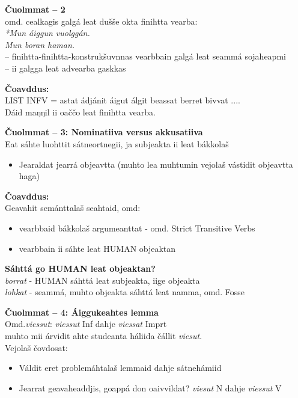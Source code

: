 \documentclass[landscape,norsk,11pt]{seminar}
\begin{document}
\begin{slide}
\newslide
\textbf{Čuolmmat -- 2} \\
omd. cealkagis galgá leat dušše okta finihtta vearba: \\
\textit{*Mun áiggun vuolggán.}\\
\textit{Mun boran haman.}\\
-- finihtta-finihtta-konstrukšuvnnas vearbbain galgá leat seammá sojaheapmi\\
-- ii galgga leat advearba gaskkas

\newslide
\textbf{Čoavddus:} \\
LIST INFV =  astat ádjánit áigut álgit beassat berret bivvat .... \\
Dáid maŋŋil ii oaččo leat finihtta vearba.


\newslide
\textbf{Čuolmmat -- 3: Nominatiiva versus akkusatiiva} \\
Eat sáhte luohttit sátneortnegii, ja subjeakta ii leat bákkolaš
\begin{itemize}
\item Jearaldat jearrá objeavtta (muhto lea muhtumin vejolaš vástidit objeavtta haga)
\end{itemize}
\newslide
\textbf{Čoavddus:} \\
Geavahit semánttalaš seahtaid, omd: 
\begin{itemize}
\item vearbbaid bákkolaš argumeanttat - omd.  Strict Transitive Verbs
\item vearbbain ii sáhte leat HUMAN objeaktan 
\end{itemize}

\newslide
\textbf{Sáhttá go HUMAN leat objeaktan?} \\

 \textit{borrat}   - HUMAN sáhttá leat subjeakta, iige objeakta \\
  \textit{lohkat}  - seammá, muhto objeakta sáhttá leat namma, omd. Fosse


\newslide
\textbf{Čuolmmat -- 4: Áiggukeahtes lemma} \\
 
Omd.\textit{viessut}: \textit{viessut} Inf dahje \textit{viessat} Imprt \\
muhto mii árvidit ahte studeanta háliida čállit \textit{viesut}. \\
Vejolaš čovdosat:

\begin{itemize}
\item{Váldit eret problemáhtalaš lemmaid dahje sátnehámiid}
\item{Jearrat geavaheaddjis, goappá don oaivvildat? \textit{viesut}  N dahje \textit{viessut} V }
\end{itemize}



\end{slide}
\end{document}
